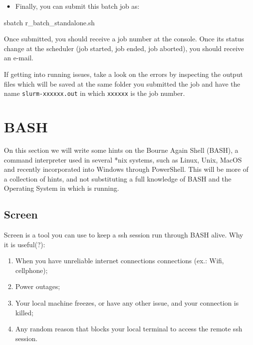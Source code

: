 \documentclass[
]{book}
\newenvironment{Shaded}{\begin{snugshade}}{\end{snugshade}}
\newcommand{\ExtensionTok}[1]{#1}
\newcommand{\NormalTok}[1]{#1}
\providecommand{\tightlist}{%
  \setlength{\itemsep}{0pt}\setlength{\parskip}{0pt}}
\begin{document}
\begin{itemize}
\tightlist
\item
  Finally, you can submit this batch job as:
\end{itemize}

\begin{Shaded}
\begin{Highlighting}[]
\ExtensionTok{sbatch}\NormalTok{ r\_batch\_standalone.sh}
\end{Highlighting}
\end{Shaded}

Once submitted, you should receive a job number at the console. Once its status
change at the scheduler (job started, job ended, job aborted), you should receive
an e-mail.

If getting into running issues, take a look on the errors by inspecting the
output files which will be saved at the same folder you submitted the job and
have the name \texttt{slurm-xxxxxx.out} in which \texttt{xxxxxx} is the job number.

\hypertarget{bash}{%
\chapter{BASH}\label{bash}}

On this section we will write some hints on the Bourne Again Shell (BASH), a command interpreter used in several *nix systems, such as Linux, Unix, MacOS and recently incorporated into Windows through PowerShell. This will be more of a collection of hints, and not substituting a full knowledge of BASH and the Operating System in which is running.

\hypertarget{screen}{%
\section{Screen}\label{screen}}

Screen is a tool you can use to keep a ssh session run through BASH alive. Why it is useful(?):

\begin{enumerate}
\def\labelenumi{\arabic{enumi}.}
\tightlist
\item
  When you have unreliable internet connections connections (ex.: Wifi, cellphone);
\item
  Power outages;
\item
  Your local machine freezes, or have any other issue, and your connection is killed;
\item
  Any random reason that blocks your local terminal to access the remote ssh session.
\end{enumerate}
\end{document}
